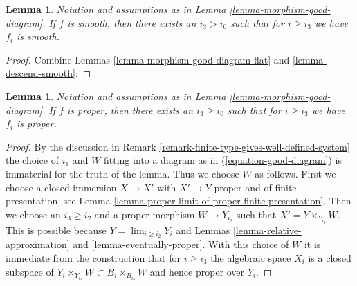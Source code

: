 \documentclass{stacks-project}
\theoremstyle{plain}
\newtheorem{lemma}[subsection]{Lemma}
\theoremstyle{definition}
\theoremstyle{remark}
\numberwithin{equation}{subsection}
\def\lim{\mathop{\mathrm{lim}}\nolimits}
\begin{document}
\begin{lemma}
\label{lemma-morphism-good-diagram-smooth}
Notation and assumptions as in Lemma \ref{lemma-morphism-good-diagram}.
If $f$ is smooth, then there exists an $i_3 > i_0$ such that for
$i \geq i_3$ we have $f_i$ is smooth.
\end{lemma}

\begin{proof}
Combine Lemmas \ref{lemma-morphism-good-diagram-flat} and
\ref{lemma-descend-smooth}.
\end{proof}

\begin{lemma}
\label{lemma-morphism-good-diagram-proper}
Notation and assumptions as in Lemma \ref{lemma-morphism-good-diagram}.
If $f$ is proper, then there exists an $i_3 \geq i_0$ such that for
$i \geq i_3$ we have $f_i$ is proper.
\end{lemma}

\begin{proof}
By the discussion in 
Remark \ref{remark-finite-type-gives-well-defined-system}
the choice of $i_1$ and $W$ fitting into a diagram as in
(\ref{equation-good-diagram}) is immaterial for the truth of
the lemma. Thus we choose $W$ as follows.
First we choose a closed immersion $X \to X'$
with $X' \to Y$ proper and of finite presentation, see
Lemma \ref{lemma-proper-limit-of-proper-finite-presentation}.
Then we choose an $i_3 \geq i_2$ and a proper morphism $W \to Y_{i_3}$
such that $X' = Y \times_{Y_{i_3}} W$. This is possible because
$Y = \lim_{i \geq i_2} Y_i$ and
Lemmas \ref{lemma-relative-approximation} and \ref{lemma-eventually-proper}.
With this choice of $W$ it is immediate from the construction that
for $i \geq i_3$ the algebraic space $X_i$ is a closed subspace of
$Y_i \times_{Y_{i_3}} W \subset B_i \times_{B_{i_3}} W$
and hence proper over $Y_i$.
\end{proof}
\end{document}
